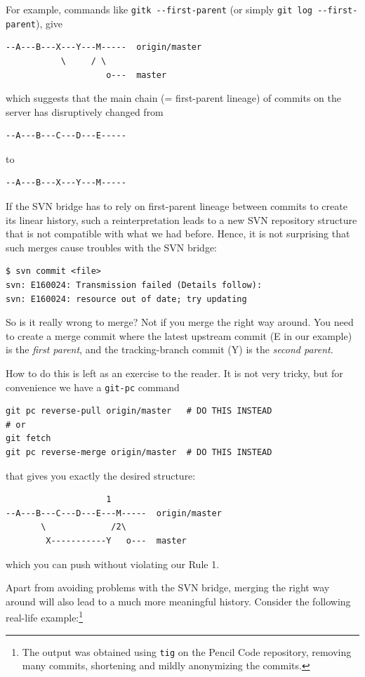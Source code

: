\documentclass[12pt,pdftex]{article}
\begin{document}
For example, commands like \texttt{gitk -{}-first-parent} (or simply \texttt{git log
  -{}-first-parent}), give
\begin{verbatim}
--A---B---X---Y---M-----  origin/master
           \     / \
                    o---  master
\end{verbatim}
which suggests that the main chain (= first-parent lineage) of commits
on the server has disruptively changed from
\begin{verbatim}
--A---B---C---D---E-----
\end{verbatim}
to
\begin{verbatim}
--A---B---X---Y---M-----
\end{verbatim}

If the SVN bridge has to rely on first-parent lineage between commits to
create its linear history, such a reinterpretation leads to a new SVN
repository structure that is not compatible with what we had before.
Hence, it is not surprising that such merges cause troubles with the SVN
bridge:
\begin{verbatim}
$ svn commit <file>
svn: E160024: Transmission failed (Details follow):
svn: E160024: resource out of date; try updating
\end{verbatim}


\bigskip

So is it really wrong to merge?
Not if you merge the right way around.
You need to create a merge commit where the latest upstream commit (E
in our example) is the \emph{first parent}, and the tracking-branch commit
(Y) is the \emph{second parent}.

How to do this is left as an exercise to the reader.
It is not very tricky, but for convenience we have a \texttt{git-pc} command
\lstset{frame=single,basicstyle=\ttfamily\footnotesize,language=sh,label= ,caption= ,captionpos=b,numbers=none}
\begin{lstlisting}
git pc reverse-pull origin/master   # DO THIS INSTEAD
# or
git fetch
git pc reverse-merge origin/master  # DO THIS INSTEAD
\end{lstlisting}
that gives you exactly the desired structure:
\begin{verbatim}
                    1
--A---B---C---D---E---M-----  origin/master
       \             /2\
        X-----------Y   o---  master
\end{verbatim}
which you can push without violating our Rule 1.

\bigskip

Apart from avoiding problems with the SVN bridge, merging the right way
around will also lead to a much more meaningful history.
Consider the following real-life example:\footnote{The output was obtained using \texttt{tig} on the Pencil Code repository,
removing many commits, shortening and mildly anonymizing the commits.}
\end{document}
